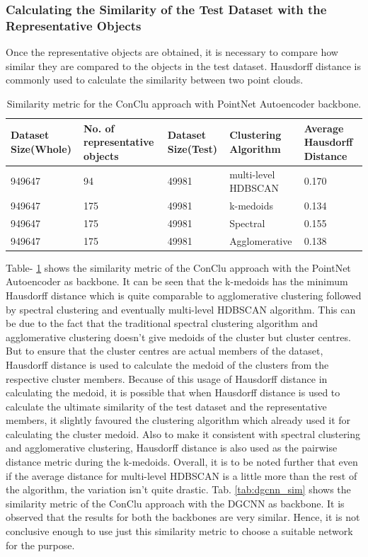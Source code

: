 \subsubsection*{Calculating the Similarity of the Test Dataset with the Representative Objects}

Once the representative objects are obtained, it is necessary to compare how similar they are compared to the objects in the test dataset. Hausdorff distance is commonly used to calculate the similarity between two point clouds.

\begin{table}[H]
  \setlength\extrarowheight{10pt}
  \caption{Similarity metric for the ConClu approach with PointNet Autoencoder backbone.}
  \centering
  \begin{tabular}{|p{50pt}|p{50pt}|p{50pt}|p{60pt}|p{50pt}|}
    \toprule
    Dataset Size(Whole)	& No. of  representative objects	& Dataset Size(Test)	& Clustering Algorithm	& Average Hausdorff Distance\\
    \midrule
    949647	& 94	& 49981	& multi-level \ac{HDBSCAN} &  0.170 \\ \cline{1-5} 
    949647	& 175	& 49981	& k-medoids	& 0.134 \\ \cline{1-5}
    949647	& 175	& 49981	& Spectral	&	0.155  \\ \cline{1-5}
    949647	& 175	& 49981	& Agglomerative	& 0.138 \\   
    \bottomrule
  \end{tabular}
  \label{tab:pointnet_sim}
\end{table}

 Table- \ref{tab:pointnet_sim} shows the similarity metric of the ConClu approach with the PointNet Autoencoder as backbone. It can be seen that the k-medoids has the minimum Hausdorff distance which is quite comparable to agglomerative clustering followed by spectral clustering and eventually multi-level \ac{HDBSCAN} algorithm. This can be due to the fact that the traditional spectral clustering algorithm and agglomerative clustering doesn't give medoids of the cluster but cluster centres. But to ensure that the cluster centres are actual members of the dataset, Hausdorff distance is used to calculate the medoid of the clusters from the respective cluster members.  Because of this usage of Hausdorff distance in calculating the medoid, it is possible that when Hausdorff distance is used to calculate the ultimate similarity of the test dataset and the representative members, it slightly favoured the clustering algorithm which already used it for calculating the cluster medoid. Also to make it consistent with spectral clustering and agglomerative clustering, Hausdorff distance is also used as the pairwise distance metric during the k-medoids. Overall, it is to be noted further that even if the average distance for multi-level \ac{HDBSCAN} is a little more  than the rest of the algorithm, the variation isn't quite drastic. Tab. \ref{tab:dgcnn_sim} shows the similarity metric of the ConClu approach with the \ac{DGCNN} as backbone. It is observed that the results for both the backbones are very similar. Hence, it is not conclusive enough to use just this similarity metric to choose a suitable network for the purpose. 

